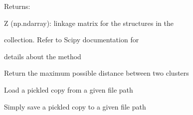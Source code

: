 \documentclass[letterpaper,10pt,english]{sphinxmanual}
\begin{document}
\begin{fulllineitems}
\begin{fulllineitems}
\begin{DUlineblock}{0em}
\item[] Returns:
\item[]
\begin{DUlineblock}{\DUlineblockindent}
\item[] Z (np.ndarray): linkage matrix for the structures in the
\item[]
\begin{DUlineblock}{\DUlineblockindent}
\item[] collection. Refer to Scipy documentation for
\item[] details about the method
\end{DUlineblock}
\end{DUlineblock}
\end{DUlineblock}

\end{fulllineitems}


\begin{fulllineitems}
\label{doctree/soprano.analyse.phylogen.phylogenclust:soprano.analyse.phylogen.phylogenclust.PhylogenCluster.get_max_cluster_dist}
Return the maximum possible distance between two clusters

\end{fulllineitems}


\begin{fulllineitems}
\label{doctree/soprano.analyse.phylogen.phylogenclust:soprano.analyse.phylogen.phylogenclust.PhylogenCluster.load}
Load a pickled copy from a given file path

\end{fulllineitems}


\begin{fulllineitems}
\label{doctree/soprano.analyse.phylogen.phylogenclust:soprano.analyse.phylogen.phylogenclust.PhylogenCluster.save}
Simply save a pickled copy to a given file path


\end{fulllineitems}
\end{fulllineitems}
\end{document}
